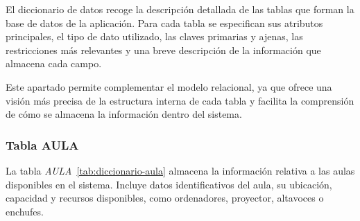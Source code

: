 El diccionario de datos recoge la descripción detallada de las tablas que forman la base de datos de la aplicación. Para cada tabla se especifican sus atributos principales, el tipo de dato utilizado, las claves primarias y ajenas, las restricciones más relevantes y una breve descripción de la información que almacena cada campo.

Este apartado permite complementar el modelo relacional, ya que ofrece una visión más precisa de la estructura interna de cada tabla y facilita la comprensión de cómo se almacena la información dentro del sistema.

\subsubsection{Tabla AULA}

La tabla \textit{AULA}~\ref{tab:diccionario-aula} almacena la información relativa a las aulas disponibles en el sistema. Incluye datos identificativos del aula, su ubicación, capacidad y recursos disponibles, como ordenadores, proyector, altavoces o enchufes.\\

